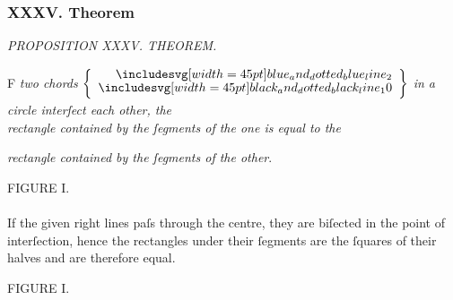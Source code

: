 \documentclass[11pt,preview]{standalone}
\begin{document}
\subsubsection{XXXV. Theorem}

\hfill

\begin{minipage}[t]{\textwidth}
    \begin{center}
        \textit{PROPOSITION XXXV. THEOREM.}\label{book3pr35} \\
    \end{center}

    \hfill

    \begin{center}
        \raggedright \lettrine[lines=3, loversize=1, nindent=0pt]{}{}F \textit{two chords} $\left\{\begin{aligned}\bimg{blue_and_dotted_blue_line_2} \\[-2ex] \bimg{black_and_dotted_black_line_10} \end{aligned}\right\}$ \textit{in a circle interſect each other, the\\ rectangle contained by the ſegments of the one is equal to the}
    \end{center}
    \vspace{1ex}
    \textit{rectangle contained by the ſegments of the other}.
\end{minipage}%

\hfill

\hfill

\begin{minipage}[t]{0.54\textwidth}
    \vspace{0pt}

    \begin{center}
        FIGURE I.\\
        \hfill\\
        If the given right lines paſs through the centre, they are biſected in the point of interſection, hence the rectangles under their ſegments are the ſquares of their halves and are therefore equal.
    \end{center}
\end{minipage}%
\hfill
\begin{minipage}[t]{0.43\textwidth}
    \vspace{0pt}
    \begin{center}
        FIGURE I.
    \end{center}
    \hfill\\
    
\end{minipage}%
\end{document}
